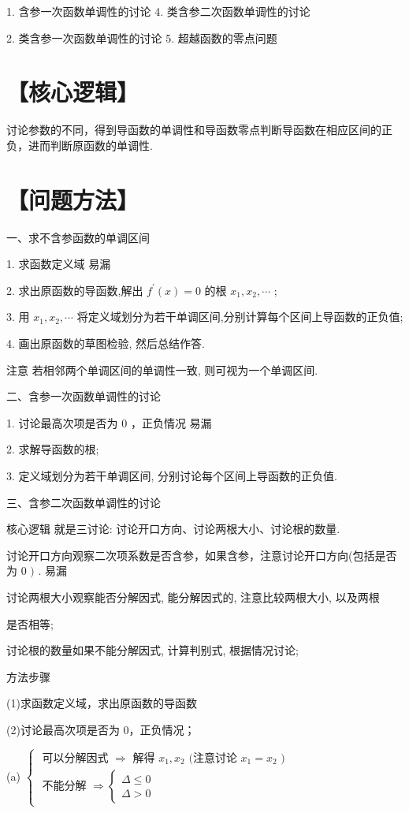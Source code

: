 \documentclass[10pt]{article}
\begin{document}
1. 含参一次函数单调性的讨论 4. 类含参二次函数单调性的讨论

2. 类含参一次函数单调性的讨论 5. 超越函数的零点问题

\section*{【核心逻辑】}

讨论参数的不同，得到导函数的单调性和导函数零点判断导函数在相应区间的正负，进而判断原函数的单调性.

\section*{【问题方法】}

一、求不含参函数的单调区间

1. 求函数定义域 易漏

2. 求出原函数的导函数,解出 \({f}^{\prime }\left( x\right)  = 0\) 的根 \({x}_{1},{x}_{2},\cdots\) ;

3. 用 \({x}_{1},{x}_{2},\cdots\) 将定义域划分为若干单调区间,分别计算每个区间上导函数的正负值;

4. 画出原函数的草图检验, 然后总结作答.

注意 若相邻两个单调区间的单调性一致, 则可视为一个单调区间.

二、含参一次函数单调性的讨论

1. 讨论最高次项是否为 0 ，正负情况 易漏

2. 求解导函数的根;

3. 定义域划分为若干单调区间, 分别讨论每个区间上导函数的正负值.

三、含参二次函数单调性的讨论

核心逻辑 就是三讨论: 讨论开口方向、讨论两根大小、讨论根的数量.

讨论开口方向观察二次项系数是否含参，如果含参，注意讨论开口方向(包括是否为 0 \()\) . 易漏

讨论两根大小观察能否分解因式, 能分解因式的, 注意比较两根大小, 以及两根

是否相等;

讨论根的数量如果不能分解因式, 计算判别式, 根据情况讨论;

方法步骤

(1)求函数定义域，求出原函数的导函数

(2)讨论最高次项是否为 0，正负情况；

(a) \(\left\{  \begin{array}{l} \text{ 可以分解因式 } \Rightarrow  \text{ 解得 }{x}_{1},{x}_{2}\text{ (注意讨论 }{x}_{1} = {x}_{2}\text{ ) } \\  \text{ 不能分解 } \Rightarrow  \left\{  \begin{array}{l} \Delta  \leq  0 \\  \Delta  > 0 \end{array}\right.  \end{array}\right.\)
\end{document}
